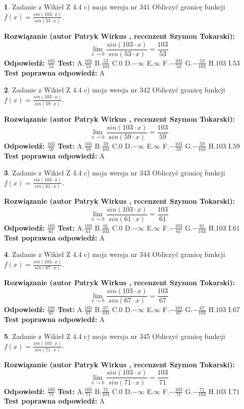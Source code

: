 \documentclass[12pt, a4paper]{article}
\theoremstyle{definition} %
\newtheorem{zad}{}
\newcommand{\zadStart}[1]{\begin{zad}#1\newline}
\newcommand{\zadStop}{\end{zad}}
\newcommand{\rozwStart}[2]{\noindent \textbf{Rozwiązanie (autor #1 , recenzent #2): }\newline}
\newcommand{\rozwStop}{\newline}
\newcommand{\odpStart}{\noindent \textbf{Odpowiedź:}\newline}
\newcommand{\odpStop}{\newline}
\newcommand{\testStart}{\noindent \textbf{Test:}\newline}
\newcommand{\testStop}{\newline}
\newcommand{\kluczStart}{\noindent \textbf{Test poprawna odpowiedź:}\newline}
\newcommand{\kluczStop}{\newline}
\begin{document}
\zadStart{Zadanie z Wikieł Z 4.4 c) moja wersja nr 341}
Obliczyć granicę funkcji $f(x)=\frac{sin(103\cdot x)}{sin(53\cdot x)}$.
\zadStop
\rozwStart{Patryk Wirkus}{Szymon Tokarski}
$$\lim\limits_{x\to 0}\frac{sin(103\cdot x)}{sin(53\cdot x)}=
\frac{103}{53}$$
\rozwStop
\odpStart
$\frac{103}{53}$
\odpStop
\testStart
A.$\frac{103}{53}$
B.$\frac{53}{103}$
C.$0$
D.$-\infty$
E.$\infty$
F.$-\frac{103}{53}$
G.$-\frac{53}{103}$
H.$103$
I.$53$
\testStop
\kluczStart
A
\kluczStop



\zadStart{Zadanie z Wikieł Z 4.4 c) moja wersja nr 342}
Obliczyć granicę funkcji $f(x)=\frac{sin(103\cdot x)}{sin(59\cdot x)}$.
\zadStop
\rozwStart{Patryk Wirkus}{Szymon Tokarski}
$$\lim\limits_{x\to 0}\frac{sin(103\cdot x)}{sin(59\cdot x)}=
\frac{103}{59}$$
\rozwStop
\odpStart
$\frac{103}{59}$
\odpStop
\testStart
A.$\frac{103}{59}$
B.$\frac{59}{103}$
C.$0$
D.$-\infty$
E.$\infty$
F.$-\frac{103}{59}$
G.$-\frac{59}{103}$
H.$103$
I.$59$
\testStop
\kluczStart
A
\kluczStop



\zadStart{Zadanie z Wikieł Z 4.4 c) moja wersja nr 343}
Obliczyć granicę funkcji $f(x)=\frac{sin(103\cdot x)}{sin(61\cdot x)}$.
\zadStop
\rozwStart{Patryk Wirkus}{Szymon Tokarski}
$$\lim\limits_{x\to 0}\frac{sin(103\cdot x)}{sin(61\cdot x)}=
\frac{103}{61}$$
\rozwStop
\odpStart
$\frac{103}{61}$
\odpStop
\testStart
A.$\frac{103}{61}$
B.$\frac{61}{103}$
C.$0$
D.$-\infty$
E.$\infty$
F.$-\frac{103}{61}$
G.$-\frac{61}{103}$
H.$103$
I.$61$
\testStop
\kluczStart
A
\kluczStop



\zadStart{Zadanie z Wikieł Z 4.4 c) moja wersja nr 344}
Obliczyć granicę funkcji $f(x)=\frac{sin(103\cdot x)}{sin(67\cdot x)}$.
\zadStop
\rozwStart{Patryk Wirkus}{Szymon Tokarski}
$$\lim\limits_{x\to 0}\frac{sin(103\cdot x)}{sin(67\cdot x)}=
\frac{103}{67}$$
\rozwStop
\odpStart
$\frac{103}{67}$
\odpStop
\testStart
A.$\frac{103}{67}$
B.$\frac{67}{103}$
C.$0$
D.$-\infty$
E.$\infty$
F.$-\frac{103}{67}$
G.$-\frac{67}{103}$
H.$103$
I.$67$
\testStop
\kluczStart
A
\kluczStop



\zadStart{Zadanie z Wikieł Z 4.4 c) moja wersja nr 345}
Obliczyć granicę funkcji $f(x)=\frac{sin(103\cdot x)}{sin(71\cdot x)}$.
\zadStop
\rozwStart{Patryk Wirkus}{Szymon Tokarski}
$$\lim\limits_{x\to 0}\frac{sin(103\cdot x)}{sin(71\cdot x)}=
\frac{103}{71}$$
\rozwStop
\odpStart
$\frac{103}{71}$
\odpStop
\testStart
A.$\frac{103}{71}$
B.$\frac{71}{103}$
C.$0$
D.$-\infty$
E.$\infty$
F.$-\frac{103}{71}$
G.$-\frac{71}{103}$
H.$103$
I.$71$
\testStop
\kluczStart
A
\kluczStop
\end{document}
